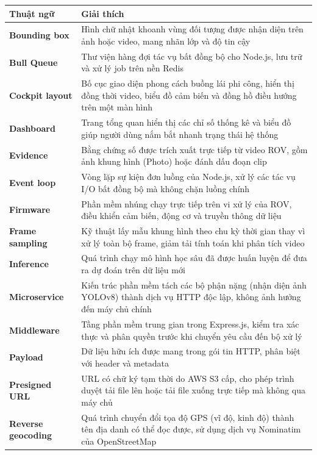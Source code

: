 \documentclass[../DoAn.tex]{subfiles}
\begin{document}
\begin{longtable}{p{4.0cm} p{10.5cm}}
    \hline
    \textbf{Thuật ngữ} & \textbf{Giải thích} \\ \hline
    \textbf{Bounding box} & Hình chữ nhật khoanh vùng đối tượng được nhận diện trên ảnh hoặc video, mang nhãn lớp và độ tin cậy \\
    \textbf{Bull Queue} & Thư viện hàng đợi tác vụ bất đồng bộ cho Node.js, lưu trữ và xử lý job trên nền Redis \\
    \textbf{Cockpit layout} & Bố cục giao diện phong cách buồng lái phi công, hiển thị đồng thời video, biểu đồ cảm biến và đồng hồ điều hướng trên một màn hình \\
    \textbf{Dashboard} & Trang tổng quan hiển thị các chỉ số thống kê và biểu đồ giúp người dùng nắm bắt nhanh trạng thái hệ thống \\
    \textbf{Evidence} & Bằng chứng số được trích xuất trực tiếp từ video ROV, gồm ảnh khung hình (Photo) hoặc đánh dấu đoạn clip \\
    \textbf{Event loop} & Vòng lặp sự kiện đơn luồng của Node.js, xử lý các tác vụ I/O bất đồng bộ mà không chặn luồng chính \\
    \textbf{Firmware} & Phần mềm nhúng chạy trực tiếp trên vi xử lý của ROV, điều khiển cảm biến, động cơ và truyền thông dữ liệu \\
    \textbf{Frame sampling} & Kỹ thuật lấy mẫu khung hình theo chu kỳ thời gian thay vì xử lý toàn bộ frame, giảm tải tính toán khi phân tích video \\
    \textbf{Inference} & Quá trình chạy mô hình học sâu đã được huấn luyện để đưa ra dự đoán trên dữ liệu mới \\
    \textbf{Microservice} & Kiến trúc phần mềm tách các bộ phận nặng (nhận diện ảnh YOLOv8) thành dịch vụ HTTP độc lập, không ảnh hưởng đến máy chủ chính \\
    \textbf{Middleware} & Tầng phần mềm trung gian trong Express.js, kiểm tra xác thực và phân quyền trước khi chuyển yêu cầu đến bộ xử lý \\
    \textbf{Payload} & Dữ liệu hữu ích được mang trong gói tin HTTP, phân biệt với header và metadata \\
    \textbf{Presigned URL} & URL có chữ ký tạm thời do AWS S3 cấp, cho phép trình duyệt tải file lên hoặc tải file xuống trực tiếp mà không qua máy chủ \\
    \textbf{Reverse geocoding} & Quá trình chuyển đổi tọa độ GPS (vĩ độ, kinh độ) thành tên địa danh có thể đọc được, sử dụng dịch vụ Nominatim của OpenStreetMap \\

\end{longtable}
\end{document}
